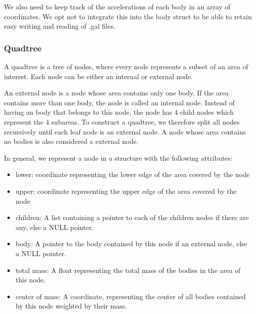 \documentclass[a4paper]{scrartcl}
\begin{document}
            We also need to keep track of the accelerations of each body in an
            array of coordinates. We opt not to integrate this into the body
            struct to be able to retain easy writing and reading of .gal files.

        \subsubsection{Quadtree}
            A quadtree is a tree of nodes, where every node represents a subset
            of an area of interest. Each node can be either an internal or external node.

            An external node is a node whose area contains only one body. If the
            area contains more than one body, the node is called an internal
            node. Instead of having an body that belongs to this node, the node
            has 4 child nodes which represent the 4 subareas. To construct a
            quadtree, we therefore split all nodes recursively until each leaf
            node is an external node. A node whose area contains no bodies is
            also considered a external node.

            In general, we represent a node in a structure with the following attributes:
            \begin{itemize}
                \item lower: coordinate representing the lower edge of the area covered by the node
                \item upper: coordinate representing the upper edge of the area covered by the node
                \item children: A list containing a pointer to each of the children nodes if there are any, else a NULL pointer.
                \item body: A pointer to the body contained by this node if an external node, else a NULL pointer.
                \item total mass: A float representing the total mass of the bodies in the area of this node.
                \item center of mass: A coordinate, representing the center of all bodies contained by this node weighted by their mass.
            \end{itemize}
\end{document}
